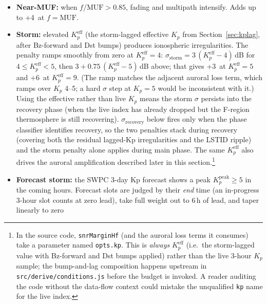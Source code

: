 \documentclass[11pt,a4paper]{article}
\newcommand{\SI}[2]{#1\,\text{#2}}
\newcommand{\dB}{\text{dB}}
\begin{document}
\begin{itemize}[nosep]
  \item \textbf{Near-MUF:} when $f/\text{MUF} > 0.85$, fading and
        multipath intensify.  Adds up to \SI{+4}{\dB} at
        $f = \text{MUF}$.
  \item \textbf{Storm:} elevated $K_p^{\text{eff}}$ (the
        storm-lagged effective $K_p$ from
        Section~\ref{sec:kplag}, after Bz-forward and Dst bumps)
        produces ionospheric irregularities.  The penalty ramps
        smoothly from zero at $K_p^{\text{eff}} = 4$:
        $\sigma_{\text{storm}} = 3\,(K_p^{\text{eff}} - 4)$\,dB
        for $4 \le K_p^{\text{eff}} < 5$, then
        $3 + 0.75\,(K_p^{\text{eff}} - 5)$\,dB above; that
        gives \SI{+3}{\dB} at $K_p^{\text{eff}} = 5$ and
        \SI{+6}{\dB} at $K_p^{\text{eff}} = 9$.  (The ramp
        matches the adjacent auroral
        loss term, which ramps over $K_p$ 4--5; a hard $\sigma$
        step at $K_p = 5$ would be inconsistent with it.)
        Using the effective rather than live $K_p$ means the storm
        $\sigma$ persists into the recovery phase (when the live
        index has already dropped but the F-region thermosphere is
        still recovering).  $\sigma_{\text{recovery}}$ below fires
        only when the phase classifier identifies recovery, so the
        two penalties stack during recovery (covering both the
        residual lagged-Kp irregularities and the LSTID ripple)
        and the storm penalty alone applies during main phase.
        The same $K_p^{\text{eff}}$ also drives the auroral
        amplification described later in this section.\footnote{In
        the source code, \texttt{snrMarginHf} (and the auroral
        loss terms it consumes) take a parameter named
        \texttt{opts.kp}.  This is \emph{always}
        $K_p^{\text{eff}}$ (i.e.\ the storm-lagged value with
        Bz-forward and Dst bumps applied) rather than the live
        3-hour $K_p$ sample; the bump-and-lag composition happens
        upstream in \texttt{src/derive/conditions.js} before the
        budget is invoked.  A reader auditing the code without
        the data-flow context could mistake the unqualified
        \texttt{kp} name for the live index.}
  \item \textbf{Forecast storm:} the SWPC 3-day Kp forecast shows a
        peak $K_p^{\text{peak}} \geq 5$ in the coming hours.
        Forecast slots are judged by their \emph{end} time (an
        in-progress 3-hour slot counts at zero lead), take full
        weight out to 6\,h of lead, and taper linearly to zero

\end{itemize}
\end{document}
